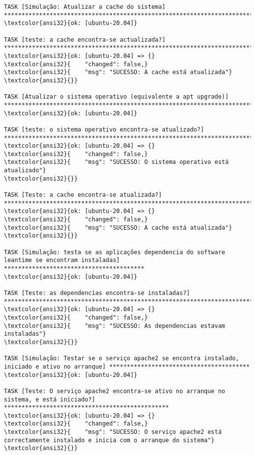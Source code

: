 \documentclass{scrartcl}
\begin{document}
\begin{Verbatim}
TASK [Simulação: Atualizar a cache do sistema] *******************************************************************************************
\textcolor{ansi32}{ok: [ubuntu-20.04]}

TASK [teste: a cache encontra-se actualizada?] *******************************************************************************************
\textcolor{ansi32}{ok: [ubuntu-20.04] => {}
\textcolor{ansi32}{    "changed": false,}
\textcolor{ansi32}{    "msg": "SUCESSO: A cache está atualizada"}
\textcolor{ansi32}{}}

TASK [Atualizar o sistema operativo (equivalente a apt upgrade)] *************************************************************************
\textcolor{ansi32}{ok: [ubuntu-20.04]}

TASK [teste: o sistema operativo encontra-se atualizado?] ********************************************************************************
\textcolor{ansi32}{ok: [ubuntu-20.04] => {}
\textcolor{ansi32}{    "changed": false,}
\textcolor{ansi32}{    "msg": "SUCESSO: O sistema operativo está atualizado"}
\textcolor{ansi32}{}}

TASK [Teste: a cache encontra-se atualizada?] ********************************************************************************************
\textcolor{ansi32}{ok: [ubuntu-20.04] => {}
\textcolor{ansi32}{    "changed": false,}
\textcolor{ansi32}{    "msg": "SUCESSO: A cache está atualizada"}
\textcolor{ansi32}{}}

TASK [Simulação: testa se as aplicações dependencia do software leantime se encontram instaladas] ****************************************
\textcolor{ansi32}{ok: [ubuntu-20.04]}

TASK [Teste: as dependencias encontra-se instaladas?] ************************************************************************************
\textcolor{ansi32}{ok: [ubuntu-20.04] => {}
\textcolor{ansi32}{    "changed": false,}
\textcolor{ansi32}{    "msg": "SUCESSO: As dependencias estavam instaladas"}
\textcolor{ansi32}{}}

TASK [Simulação: Testar se o serviço apache2 se encontra instalado, iniciado e ativo no arranque] ****************************************
\textcolor{ansi32}{ok: [ubuntu-20.04]}

TASK [Teste: O serviço apache2 encontra-se ativo no arranque no sistema, e está iniciado?] ***********************************************
\textcolor{ansi32}{ok: [ubuntu-20.04] => {}
\textcolor{ansi32}{    "changed": false,}
\textcolor{ansi32}{    "msg": "SUCESSO: O serviço apache2 está correctamente instalado e inicia com o arranque do sistema"}
\textcolor{ansi32}{}}


\end{Verbatim}
\end{document}
